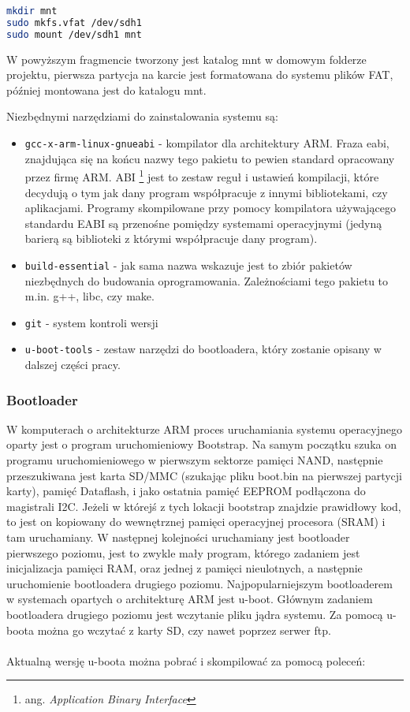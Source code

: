 \begin{lstlisting}[language=bash]
mkdir mnt
sudo mkfs.vfat /dev/sdh1
sudo mount /dev/sdh1 mnt
\end{lstlisting}

W powyższym fragmencie tworzony jest katalog mnt w domowym folderze projektu, pierwsza partycja na karcie jest formatowana do systemu plików FAT, później montowana jest do katalogu mnt.


Niezbędnymi narzędziami do zainstalowania systemu są:
\begin{itemize}
	\item {\lstinline|gcc-x-arm-linux-gnueabi|}  - kompilator dla architektury ARM. Fraza eabi, znajdująca się na końcu nazwy tego pakietu to pewien standard opracowany przez firmę ARM. ABI  \footnote{ang. \emph{Application Binary Interface}} jest to zestaw reguł i ustawień kompilacji, które decydują o tym jak dany program współpracuje z innymi bibliotekami, czy aplikacjami. Programy skompilowane przy pomocy kompilatora używającego standardu EABI są przenośne pomiędzy systemami operacyjnymi (jedyną barierą są biblioteki z którymi współpracuje dany program).
	\item {\lstinline|build-essential|} - jak sama nazwa wskazuje jest to zbiór pakietów niezbędnych do budowania oprogramowania. Zależnościami tego pakietu to m.in. g++, libc, czy make.
	\item {\lstinline|git|} - system kontroli wersji
	\item {\lstinline|u-boot-tools|} - zestaw narzędzi do bootloadera, który zostanie opisany w dalszej części pracy.
\end{itemize}


\subsubsection{Bootloader}

W komputerach o architekturze ARM proces uruchamiania systemu operacyjnego oparty jest o program uruchomieniowy Bootstrap. Na samym początku szuka on programu uruchomieniowego w pierwszym sektorze pamięci NAND, następnie przeszukiwana jest karta SD/MMC (szukając pliku boot.bin na pierwszej partycji karty), pamięć Dataflash, i jako ostatnia pamięć EEPROM podłączona do magistrali I2C. Jeżeli w którejś z tych lokacji bootstrap znajdzie prawidłowy kod, to jest on kopiowany do wewnętrznej pamięci operacyjnej procesora (SRAM) i tam uruchamiany. W następnej kolejności uruchamiany jest bootloader pierwszego poziomu, jest to zwykle mały program, którego zadaniem jest inicjalizacja pamięci RAM, oraz jednej z pamięci nieulotnych, a następnie uruchomienie bootloadera drugiego poziomu.
Najpopularniejszym bootloaderem w systemach opartych o architekturę ARM jest u-boot. Głównym zadaniem bootloadera drugiego poziomu jest wczytanie pliku jądra systemu. Za pomocą u-boota można go wczytać z karty SD, czy nawet poprzez serwer ftp.
\\
\\
Aktualną wersję u-boota można pobrać i skompilować za pomocą poleceń:

